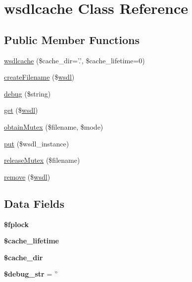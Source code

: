 \hypertarget{classwsdlcache}{\section{wsdlcache Class Reference}
\label{classwsdlcache}
}
\subsection*{Public Member Functions}
\begin{DoxyCompactItemize}
\item 
\hyperlink{classwsdlcache_a79f1d857b43ad05cccead7d6c276b799}{wsdlcache} (\$cache\-\_\-dir='.', \$cache\-\_\-lifetime=0)
\item 
\hyperlink{classwsdlcache_a6251fc73486e49b3ad8452c3cff4f4df}{create\-Filename} (\$\hyperlink{classwsdl}{wsdl})
\item 
\hyperlink{classwsdlcache_ac652bd9010bd39b0f2854f7ded3f6f33}{debug} (\$string)
\item 
\hyperlink{classwsdlcache_a95483fbc06ab50e4e5720ec16065b4f5}{get} (\$\hyperlink{classwsdl}{wsdl})
\item 
\hyperlink{classwsdlcache_a0ad0130e7028ed6b671ecdf4491dc7a2}{obtain\-Mutex} (\$filename, \$mode)
\item 
\hyperlink{classwsdlcache_a797ff61a54a3f50e9cb8c974cacc1bb8}{put} (\$wsdl\-\_\-instance)
\item 
\hyperlink{classwsdlcache_a424545075e6a286d26453c500ecaa26d}{release\-Mutex} (\$filename)
\item 
\hyperlink{classwsdlcache_ad6672e5263a78393605bc28e80d25902}{remove} (\$\hyperlink{classwsdl}{wsdl})
\end{DoxyCompactItemize}
\subsection*{Data Fields}
\begin{DoxyCompactItemize}
\item 
\hypertarget{classwsdlcache_ae9b06e44c182e3d33c7393dd8f925c15}{{\bfseries \$fplock}}\label{classwsdlcache_ae9b06e44c182e3d33c7393dd8f925c15}

\item 
\hypertarget{classwsdlcache_a5aaab753f75170fa670cbb602aa97119}{{\bfseries \$cache\-\_\-lifetime}}\label{classwsdlcache_a5aaab753f75170fa670cbb602aa97119}

\item 
\hypertarget{classwsdlcache_a22a35efc9ca709527d49ff8bfe76db78}{{\bfseries \$cache\-\_\-dir}}\label{classwsdlcache_a22a35efc9ca709527d49ff8bfe76db78}

\item 
\hypertarget{classwsdlcache_ad04cbe402f400eb4b0b40f2c03985452}{{\bfseries \$debug\-\_\-str} = ''}\label{classwsdlcache_ad04cbe402f400eb4b0b40f2c03985452}

\end{DoxyCompactItemize}


